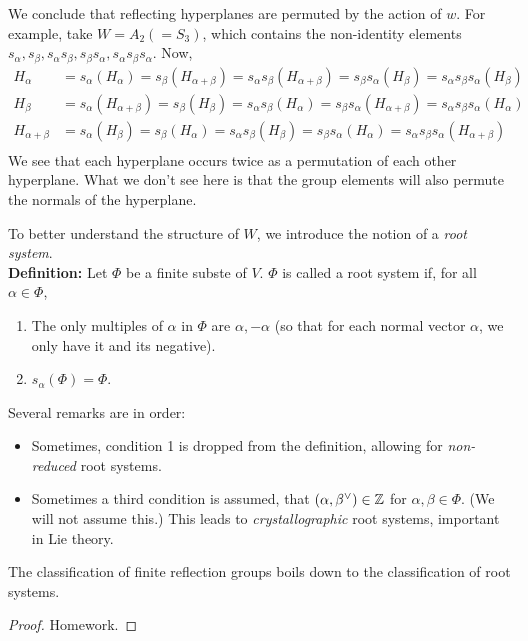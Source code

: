 We conclude that reflecting hyperplanes are permuted by the action of $w$. For
example, take $W = A_2 (= S_3)$,
%
%
which contains the non-identity elements $s_\alpha, s_\beta, s_\alpha s_\beta,
s_\beta s_\alpha, s_\alpha s_\beta s_\alpha$. Now,
\begin{align*}
    H_\alpha
    &= s_\alpha(H_\alpha)
    = s_\beta (H_{\alpha+\beta})
    = s_\alpha s_\beta(H_{\alpha+\beta})
    = s_\beta s_\alpha (H_\beta)
    = s_\alpha s_\beta s_\alpha (H_\beta) \\
    H_\beta
    &= s_\alpha(H_{\alpha+\beta})
    = s_\beta (H_{\beta})
    = s_\alpha s_\beta(H_\alpha)
    = s_\beta s_\alpha (H_{\alpha+\beta})
    = s_\alpha s_\beta s_\alpha (H_{\alpha}) \\
    H_{\alpha+\beta}
    &= s_\alpha(H_{\beta})
    = s_\beta (H_{\alpha})
    = s_\alpha s_\beta(H_\beta)
    = s_\beta s_\alpha (H_{\alpha})
    = s_\alpha s_\beta s_\alpha (H_{\alpha+\beta}) \\
\end{align*}
We see that each hyperplane occurs twice as a permutation of each other
hyperplane. What we don't see here is that the group elements will also permute
the normals of the hyperplane.

To better understand the structure of $W$, we introduce the notion of a
{\em root system}.
\\

{\bf Definition:} Let $\Phi$ be a finite subste of $V$. $\Phi$ is called a root
system if, for all $\alpha \in \Phi$,
\begin{enumerate}
\item The only multiples of $\alpha$ in $\Phi$ are
$\alpha, -\alpha$ (so that for each normal vector $\alpha$, we only have it
and its negative).
\item $s_\alpha(\Phi) = \Phi$.
\end{enumerate}
Several remarks are in order:
\begin{itemize}
\item Sometimes, condition 1 is dropped from the definition, allowing for
{\em non-reduced} root systems.
\item Sometimes a third condition is assumed, that $(\alpha, \beta^\vee) \in \mathbb{Z}$
for $\alpha, \beta \in \Phi$. (We will not assume this.)
This leads to {\em crystallographic} root systems, important in Lie theory.
\end{itemize}

\begin{lemma}
The classification of finite reflection groups boils down to the classification
of root systems.
\end{lemma}

\begin{proof}
Homework.
\end{proof}
